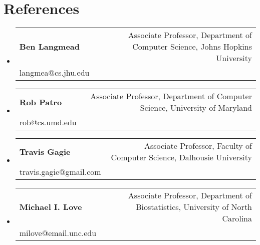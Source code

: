 \documentclass[A4,11pt]{article}
\makeatletter
\newcommand{\CVSubheading}[4]{
  \vspace{-2pt}\item
    \begin{tabular*}{0.97\textwidth}[t]{l@{\extracolsep{\fill}}r}
      \textbf{#1} & #2 \\
      \small#3 & \small #4 \\
    \end{tabular*}\vspace{-7pt}
}
\newcommand{\CVSubHeadingListStart}{\begin{itemize}[leftmargin=0.5cm, label={}]}
\newcommand{\CVSubHeadingListEnd}{\end{itemize}}
\makeatother
\begin{document}
\begin{comment}
\section{Community Involvement}
  \CVSubHeadingListStart
    \CVSubheading
      {Austin College Community Tutors}{Fall 2017 -- Fall 2018}
      {Free tutoring for local students in science and mathematics}{Sherman, TX}
    \CVSubheading
      {River Legacy Nature Center}{September 2015 -- August 2016}
      {Provided assistance for various youth science education programs}{Arlington, TX}
    \CVSubheading
      {Back on My Feet Run Club}{April 2014 -- August 2015}
      {Helping to reestablish homeless persons in the community}{Austin, TX}
  \CVSubHeadingListEnd
\end{comment}
\begin{comment}
This section is compressed from the various skills sections that Euro CV
recommends.
\end{comment}

    

\section{References}
\CVSubHeadingListStart
  \CVSubheading
    {Ben Langmead}{Associate Professor, Department of Computer Science, Johns Hopkins University}
    {langmea@cs.jhu.edu}{}
  \CVSubheading
    {Rob Patro}{Associate Professor, Department of Computer Science, University of Maryland}
    {rob@cs.umd.edu}{ }
\CVSubheading
    {Travis Gagie}{Associate Professor, Faculty of Computer Science, Dalhousie University}
    {travis.gagie@gmail.com}{ }
\CVSubheading
    {Michael I. Love}{Associate Professor, Department of Biostatistics, University of North Carolina}
    {milove@email.unc.edu}{ }
\CVSubHeadingListEnd
\end{document}
